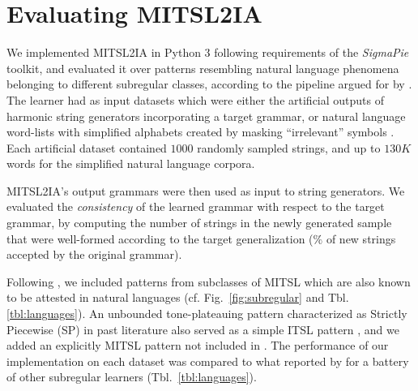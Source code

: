 \documentclass[11pt]{article}
\begin{document}
\section{Evaluating MITSL2IA}
    We implemented MITSL2IA in Python 3 following requirements of the \emph{SigmaPie} toolkit, and evaluated it  over patterns resembling natural language phenomena belonging to different subregular classes, according to the pipeline argued for by \citet{aksenova2020tool}.\@
    The learner had as input datasets which were either the artificial outputs of harmonic string generators incorporating a target grammar, or natural language word-lists with simplified alphabets created by masking ``irrelevant'' symbols \cite[for details see][]{aksenova2020tool}. 
    Each artificial dataset contained $1000$ randomly sampled strings, and up to $130K$ words for the simplified natural language corpora.\@
  
    MITSL2IA's output grammars were then used as input to string generators.\@
    We evaluated the \emph{consistency} of the learned grammar with respect to the target grammar, by computing the number of strings in the newly generated sample that were well-formed according to the target generalization ($\%$ of new strings accepted by the original grammar).\@
  
  Following  \citep{aksenova2020tool}, we included patterns from subclasses of MITSL which are also known to be attested in natural languages (cf. Fig.\ \ref{fig:subregular} and Tbl.\ref{tbl:languages}).
  An unbounded tone-plateauing pattern \citep{hyman2010tone,Jardine16} characterized as Strictly Piecewise (SP)  in past literature also served as a simple ITSL pattern \citep{de2019structure}, and we added an explicitly MITSL pattern not included in \citep{aksenova2020tool}.
        The performance of our implementation on each dataset was compared to what reported by \citet[][]{aksenova2020tool} for a battery of other subregular learners (Tbl.\ \ref{tbl:languages}).\@
\end{document}
